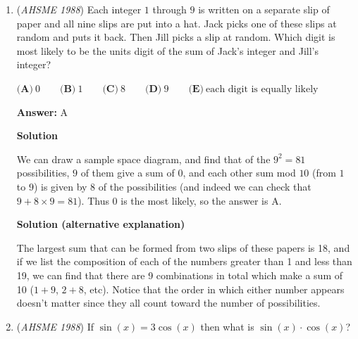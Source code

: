 \begin{enumerate}
 $\textbf{(A)}\ A\qquad \textbf{(B)}\ B\qquad \textbf{(C)}\ C\qquad \textbf{(D)}\ D\qquad \textbf{(E)}\ E$

 \textbf{Answer: }C



\textbf{Solution}

We simply have to divide the present population by the original, and whichever one is the largest have the greatest percent change. City $\text{A}$  is $\frac{50}{40}=1.25$. City $\text{B}$ is $\frac{70}{50}=1.4$. City $\text{C}$ is $\frac{100}{70} \approx 1.42$. City $\text{D}$ is $\frac{130}{100}=1.3$. City $\text{E}$ is $\frac{160}{120} \approx 1.33$. City $\text{C}$ has the greatest value, so the answer is $\boxed{\text{C}}$.

 


	\item (\textit{AHSME 1988}) Each integer $1$ through $9$ is written on a separate slip of paper and all nine slips are put into a hat. 
Jack picks one of these slips at random and puts it back. Then Jill picks a slip at random. 
Which digit is most likely to be the units digit of the sum of Jack's integer and Jill's integer?


 $\textbf{(A)}\ 0\qquad \textbf{(B)}\ 1\qquad \textbf{(C)}\ 8\qquad \textbf{(D)}\ 9\qquad \textbf{(E)}\ \text{each digit is equally likely}$

 \textbf{Answer: }A



\textbf{Solution}

We can draw a sample space diagram, and find that of the $9^2 = 81$ possibilities, $9$ of them give a sum of $0$, and each other sum mod $10$ (from $1$ to $9$) is given by $8$ of the possibilities (and indeed we can check that $9 + 8 \times 9 = 81$). Thus $0$ is the most likely, so the answer is $\boxed{\text{A}}$.

 



\textbf{Solution (alternative explanation)}

The largest sum that can be formed from two slips of these papers is 18, and if we list the composition of each of the numbers greater than 1 and less than 19, we can find that there are 9 combinations in total which make a sum of 10 ($1+9$, $2+8$, etc). Notice that the order in which either number appears doesn't matter since they all count toward the number of possibilities.

 


	\item (\textit{AHSME 1988}) If $\sin(x)= 3\cos(x)$ then what is $\sin(x) \cdot \cos(x)$?



\end{enumerate}
